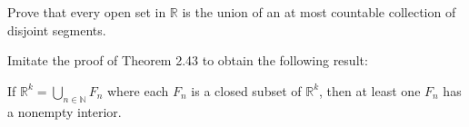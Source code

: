 \documentclass[12 pt, letterpaper]{hmcpset}
\begin{document}
\pagebreak

\begin{problem}[29.]
	Prove that every open set in $\mathbb{R}$ is the union of an at most countable collection of disjoint segments.
\end{problem}

\pagebreak

\begin{problem}[30.]
	Imitate the proof of Theorem 2.43 to obtain the following result: 

	If $\mathbb{R}^{k} = \bigcup_{n \in \mathbb{N}} F_{n}$ where each $F_{n}$ is a closed subset of  $\mathbb{R}^{k}$, then at least one $F_{n}$ has a nonempty interior. \\
\end{problem}
\end{document}
